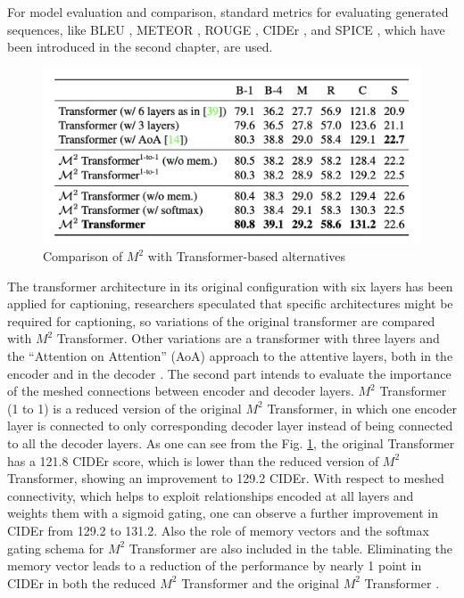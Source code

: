 \documentclass[
]{krantz}
\begin{document}
For model evaluation and comparison, standard metrics for evaluating generated sequences, like BLEU \citep{papineni-etal-2002-bleu}, METEOR \citep{meteor}, ROUGE \citep{lin-2004-rouge}, CIDEr \citep{cider}, and SPICE \citep{spice}, which have been introduced in the second chapter, are used.

\begin{figure}

{\centering \includegraphics[width=1\linewidth]{figures/02-01/02-02 compare1} 

}

\caption{Comparison of \(M^2\) with Transformer-based alternatives \citep{cornia2020m2}}\label{fig:compare1}
\end{figure}



The transformer architecture in its original configuration with six layers has been applied for captioning, researchers speculated that specific architectures might be required for captioning, so variations of the original transformer are compared with \(M^2\) Transformer. Other variations are a transformer with three layers and the ``Attention on Attention'' (AoA) approach \citep{huang1} to the attentive layers, both in the encoder and in the decoder \citep{cornia2020m2}.
The second part intends to evaluate the importance of the meshed connections between encoder and decoder layers. \(M^2\) Transformer (1 to 1) is a reduced version of the original \(M^2\) Transformer, in which one encoder layer is connected to only corresponding decoder layer instead of being connected to all the decoder layers.
As one can see from the Fig. \ref{fig:compare1}, the original Transformer has a 121.8 CIDEr score, which is lower than the reduced version of \(M^2\) Transformer, showing an improvement to 129.2 CIDEr. With respect to meshed connectivity, which helps to exploit relationships encoded at all layers and weights them with a sigmoid gating, one can observe a further improvement in CIDEr from 129.2 to 131.2. Also the role of memory vectors and the softmax gating schema for \(M^2\) Transformer are also included in the table. Eliminating the memory vector leads to a reduction of the performance by nearly 1 point in CIDEr in both the reduced \(M^2\) Transformer and the original \(M^2\) Transformer \citep{cornia2020m2}.
\end{document}
